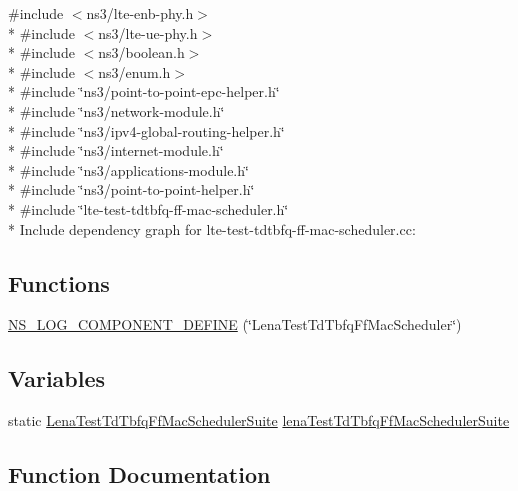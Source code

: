 {\ttfamily \#include $<$ns3/lte-\/enb-\/phy.\+h$>$}\\*
{\ttfamily \#include $<$ns3/lte-\/ue-\/phy.\+h$>$}\\*
{\ttfamily \#include $<$ns3/boolean.\+h$>$}\\*
{\ttfamily \#include $<$ns3/enum.\+h$>$}\\*
{\ttfamily \#include \char`\"{}ns3/point-\/to-\/point-\/epc-\/helper.\+h\char`\"{}}\\*
{\ttfamily \#include \char`\"{}ns3/network-\/module.\+h\char`\"{}}\\*
{\ttfamily \#include \char`\"{}ns3/ipv4-\/global-\/routing-\/helper.\+h\char`\"{}}\\*
{\ttfamily \#include \char`\"{}ns3/internet-\/module.\+h\char`\"{}}\\*
{\ttfamily \#include \char`\"{}ns3/applications-\/module.\+h\char`\"{}}\\*
{\ttfamily \#include \char`\"{}ns3/point-\/to-\/point-\/helper.\+h\char`\"{}}\\*
{\ttfamily \#include \char`\"{}lte-\/test-\/tdtbfq-\/ff-\/mac-\/scheduler.\+h\char`\"{}}\\*
Include dependency graph for lte-\/test-\/tdtbfq-\/ff-\/mac-\/scheduler.cc\+:
\subsection*{Functions}
\begin{DoxyCompactItemize}
\item 
\hyperlink{lte-test-tdtbfq-ff-mac-scheduler_8cc_ace7fe3273cb75e4f46c0fe773a8e27ec}{N\+S\+\_\+\+L\+O\+G\+\_\+\+C\+O\+M\+P\+O\+N\+E\+N\+T\+\_\+\+D\+E\+F\+I\+NE} (\char`\"{}Lena\+Test\+Td\+Tbfq\+Ff\+Mac\+Scheduler\char`\"{})
\end{DoxyCompactItemize}
\subsection*{Variables}
\begin{DoxyCompactItemize}
\item 
static \hyperlink{classLenaTestTdTbfqFfMacSchedulerSuite}{Lena\+Test\+Td\+Tbfq\+Ff\+Mac\+Scheduler\+Suite} \hyperlink{lte-test-tdtbfq-ff-mac-scheduler_8cc_a487f115b88e365af30442f53e1974f66}{lena\+Test\+Td\+Tbfq\+Ff\+Mac\+Scheduler\+Suite}
\end{DoxyCompactItemize}


\subsection{Function Documentation}
